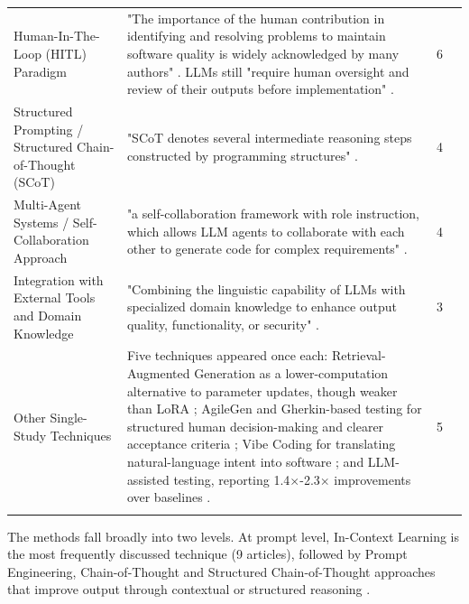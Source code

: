 {\begin{longtable}{>{\raggedright\arraybackslash} p{3cm} p{9.3cm} p{0.2cm} >{\raggedright\arraybackslash}p{1.8cm}}
Human-In-The-Loop (HITL) Paradigm & "The importance of the human contribution in identifying and resolving problems to maintain software quality is widely acknowledged by many authors" \cite{Kim:2025ao}. \acp{LLM} still "require human oversight and review of their outputs before implementation" \cite{Kim:2025ao, Terragni:2025fa}. & 6 & \cite{Kim:2025ao, Wang:2025rs, Terragni:2025fa, Hemmat:2025rd, Haque:2025la, Zamfiroiu:2025ec}\\ \addlinespace

Structured Prompting / Structured Chain-of-Thought (SCoT) & "SCoT denotes several intermediate reasoning steps constructed by programming structures" \cite{Li:2025sc}. & 4 & \cite{Li:2025sc, Han:2025mg, Jabrw:2025ss, Kim:2025is} \\ \addlinespace

Multi-Agent Systems / Self-Collaboration Approach & "a self-collaboration framework with role instruction, which allows LLM agents to collaborate with each other to generate code for complex requirements" \cite{Wang:2025rs, Dong:2024sc}. & 4 & \cite{Wang:2025rs, Dong:2024sc, Banh:2025cf, Bai:2025ci} \\ \addlinespace

Integration with External Tools and Domain Knowledge & "Combining the linguistic capability of LLMs with specialized domain knowledge to enhance output quality, functionality, or security" \cite{Wang:2025rs, Banh:2025cf}. & 3 & \cite{Wang:2025rs, Banh:2025cf, Zhang:2025ea, Ahmed:2025ai} \\ \addlinespace

Other Single-Study Techniques & Five techniques appeared once each: Retrieval-Augmented Generation as a lower-computation alternative to parameter updates, though weaker than LoRA \cite{Weyssow:2025ep, Chen:2025es}; AgileGen and Gherkin-based testing for structured human decision-making and clearer acceptance criteria \cite{Zhang:2025ea}; Vibe Coding for translating natural-language intent into software \cite{Moore:2025vc}; and LLM-assisted testing, reporting 1.4$\times$-2.3$\times$ improvements over baselines \cite{Wang:2025rs}. & 5 & \cite{Weyssow:2025ep, Chen:2025es, Zhang:2025ea, Moore:2025vc, Wang:2025rs} \\ \addlinespace

\end{longtable}
}

The methods fall broadly into two levels. At prompt level, In-Context Learning is the most frequently discussed technique (9 articles), followed by Prompt Engineering, Chain-of-Thought and Structured Chain-of-Thought approaches that improve output through contextual or structured reasoning \cite{Li:2025sc}.

